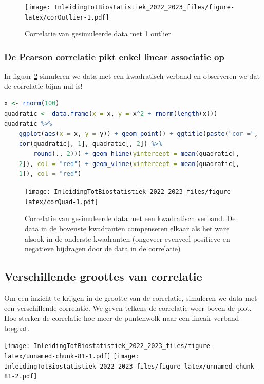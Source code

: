 \documentclass[
  12pt,dutch,coursenotes]{book}
\begin{document}
\begin{figure}
\centering
\texttt{[image: InleidingTotBiostatistiek\_2022\_2023\_files/figure-latex/corOutlier-1.pdf]}
\caption{\label{fig:corOutlier}Correlatie van gesimuleerde data met 1 outlier}
\end{figure}

\hypertarget{de-pearson-correlatie-pikt-enkel-linear-associatie-op}{%
\subsubsection{De Pearson correlatie pikt enkel linear associatie op}\label{de-pearson-correlatie-pikt-enkel-linear-associatie-op}}

In figuur \ref{fig:corQuad} simuleren we data met een kwadratisch verband en observeren we dat de correlatie bijna nul is!

\begin{lstlisting}[language=R]
x <- rnorm(100)
quadratic <- data.frame(x = x, y = x^2 + rnorm(length(x)))
quadratic %>%
    ggplot(aes(x = x, y = y)) + geom_point() + ggtitle(paste("cor =",
    cor(quadratic[, 1], quadratic[, 2]) %>%
        round(., 2))) + geom_hline(yintercept = mean(quadratic[,
    2]), col = "red") + geom_vline(xintercept = mean(quadratic[,
    1]), col = "red")
\end{lstlisting}

\begin{figure}
\centering
\texttt{[image: InleidingTotBiostatistiek\_2022\_2023\_files/figure-latex/corQuad-1.pdf]}
\caption{\label{fig:corQuad}Correlatie van gesimuleerde data met een kwadratisch verband. De data in de bovenste kwadranten compenseren elkaar als het ware alsook in de onderste kwadranten (ongeveer evenveel positieve en negatieve bijdragen door de data in de correlatie)}
\end{figure}

\hypertarget{verschillende-groottes-van-correlatie}{%
\subsection{Verschillende groottes van correlatie}\label{verschillende-groottes-van-correlatie}}

Om een inzicht te krijgen in de grootte van de correlatie, simuleren we data met een verschillende correlatie. We geven telkens de correlatie weer boven de plot. Hoe sterker de correlatie hoe meer de puntenwolk naar een lineair verband toegaat.

\texttt{[image: InleidingTotBiostatistiek\_2022\_2023\_files/figure-latex/unnamed-chunk-81-1.pdf]} \texttt{[image: InleidingTotBiostatistiek\_2022\_2023\_files/figure-latex/unnamed-chunk-81-2.pdf]}
\end{document}
